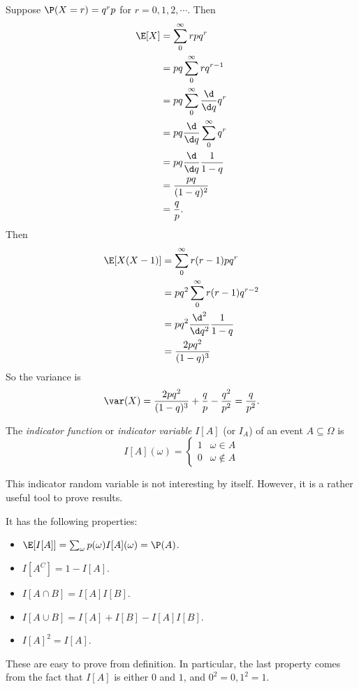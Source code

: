 \documentclass[a4paper]{article}
\begin{document}
\begin{eg}
  Suppose $\P(X = r) = q^r p$ for $r= 0, 1, 2, \cdots$. Then
  \begin{align*}
    \E[X] &= \sum_{0}^\infty rpq^r \\
    &= pq\sum_{0}^\infty rq^{r - 1}\\
    &= pq\sum_{0}^\infty \frac{\d }{\d q}q^r\\
    &= pq\frac{\d }{\d q}\sum_{0}^\infty q^r\\
    &= pq\frac{\d }{\d q}\frac{1}{1 - q}\\
    &= \frac{pq}{(1 - q)^2}\\
    &= \frac{q}{p}.
  \end{align*}
  Then
  \begin{align*}
    \E[X(X - 1)] &= \sum_{0}^\infty r(r - 1)pq^r\\
    &= pq^2 \sum_0^\infty r(r - 1)q^{r - 2}\\
    &= pq^2\frac{\d ^2}{\d q^2}\frac{1}{1 - q}\\
    &= \frac{2pq^2}{(1 - q)^3}
  \end{align*}
  So the variance is
  \[
    \var(X) = \frac{2pq^2}{(1 - q)^3}+ \frac{q}{p} - \frac{q^2}{p^2} = \frac{q}{p^2}.
  \]
\end{eg}

\begin{defi}
  The \emph{indicator function} or \emph{indicator variable} $I[A]$ (or $I_A$) of an event $A\subseteq \Omega$ is
  \[
    I[A](\omega) =
    \begin{cases}
      1 & \omega\in A\\
      0 & \omega\not\in A
    \end{cases}
  \]
\end{defi}
This indicator random variable is not interesting by itself. However, it is a rather useful tool to prove results.

It has the following properties:
\begin{prop}\leavevmode
  \begin{itemize}
    \item $\E[I[A]] = \sum_\omega p(\omega) I[A](\omega) = \P(A)$.
    \item $I[A^C] = 1 - I[A]$.
    \item $I[A\cap B] = I[A]I[B]$.
    \item $I[A\cup B] = I[A] + I[B] - I[A]I[B]$.
    \item $I[A]^2 = I[A]$.
  \end{itemize}
\end{prop}
These are easy to prove from definition. In particular, the last property comes from the fact that $I[A]$ is either $0$ and $1$, and $0^2 = 0, 1^2 = 1$.
\end{document}
